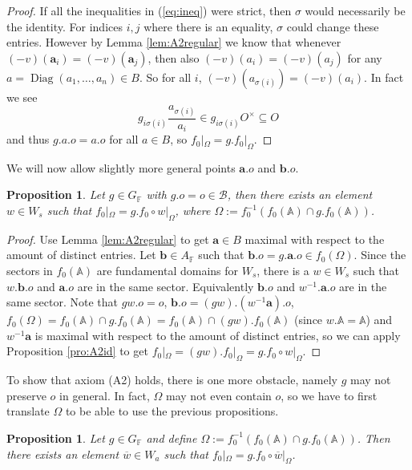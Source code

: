 \documentclass[12pt]{amsart}
\newcommand{\F}{\mathbb{F} }
\newcommand{\A}{\mathbb{A}}
\newcommand{\B}{\mathcal{B}}
\newcommand{\diag}[1]{\operatorname{Diag}\left( #1_1, \ldots , #1_n\right) }
\numberwithin{equation}{section}
\newtheorem{proposition}[theorem]{Proposition}
\theoremstyle{remark} %
\begin{document}
\begin{proof}
	If all the inequalities in (\ref{eq:ineq}) were strict, then $\sigma$ would necessarily be the identity. For indices $i,j$ where there is an equality, $\sigma$ could change these entries. However by Lemma \ref{lem:A2regular} we know that whenever $(-v)(\pmb{a}_i)=(-v)(\pmb{a}_j)$, then also $(-v)(a_i) = (-v)(a_j)$ for any $a=\diag{a} \in B$. So for all $i$, $(-v)(a_{\sigma(i)})=(-v)(a_i)$. In fact we see
	$$
	g_{i\sigma(i)}\frac{a_{\sigma(i)}}{a_i}\in g_{i\sigma(i)} O^\times \subseteq O
	$$
	and thus $g.a.o=a.o$ for all $a \in B$, so $f_0|_\Omega = g.f_0|_\Omega$.
\end{proof}
We will now allow slightly more general points $\pmb{a}.o$ and $\pmb{b}.o$.
\begin{proposition}
	\label{pro:A2W}
	Let $g\in G_\F$ with $g.o = o \in \B$, then there exists an element $w \in W_s$ such that $f_0|_\Omega = g.f_0 \circ w|_\Omega$, where $\Omega := f_0^{-1}\left( f_0(\A)\cap g.f_0(\A) \right)$.
\end{proposition}
\begin{proof}
	Use Lemma \ref{lem:A2regular} to get $\pmb{a}\in B$ maximal with respect to the amount of distinct entries. Let $\pmb{b}\in A_\F$ such that $\pmb{b}.o=g.\pmb{a}.o \in f_0(\Omega)$. Since the sectors in $f_0(\A)$ are fundamental domains for $W_s$, there is a $w \in W_s$ such that $w.\pmb{b}.o$ and $\pmb{a}.o$ are in the same sector. Equivalently $\pmb{b}.o$ and $w^{-1}.\pmb{a}.o$ are in the same sector. Note that $gw.o = o$, $\pmb{b}.o = (gw).(w^{-1}\pmb{a}).o$, $f_0(\Omega)=f_0(\A)\cap g.f_0(\A)=f_0(\A)\cap (gw).f_0(\A)$ (since $w.\A = \A$) and $w^{-1}\pmb{a}$ is maximal with respect to the amount of distinct entries, so we can apply Proposition \ref{pro:A2id} to get $f_0|_\Omega = (gw).f_0|_\Omega=g.f_0 \circ w |_\Omega$.
\end{proof}
To show that axiom (A2) holds, there is one more obstacle, namely $g$ may not preserve $o$ in general. In fact, $\Omega$ may not even contain $o$, so we have to first translate $\Omega$ to be able to use the previous propositions. 
\begin{proposition}
	\label{pro:A2aW} %
	Let $g \in G_\F$ and define $\Omega := f_0^{-1}\left( f_0(\A)\cap g.f_0(\A) \right)$. Then there exists an element $\overline{w} \in W_a$ such that $f_0|_\Omega = g.f_0 \circ \overline{w}|_\Omega$.
\end{proposition}
\end{document}
